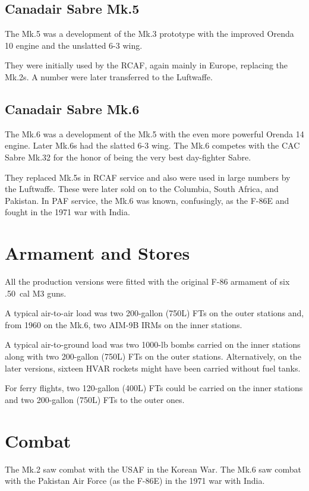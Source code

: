 \subsection{Canadair Sabre Mk.5}

The Mk.5 was a development of the Mk.3 prototype with the improved Orenda 10 engine and the unslatted 6-3 wing.

They were initially used by the RCAF, again mainly in Europe, replacing the Mk.2s. A number were later transferred to the Luftwaffe.

\subsection{Canadair Sabre Mk.6}

The Mk.6 was a development of the Mk.5 with the even more powerful Orenda 14 engine. Later Mk.6s had the slatted 6-3 wing. The Mk.6 competes with the CAC Sabre Mk.32 for the honor of being the very best day-fighter Sabre.

They replaced Mk.5s in RCAF service and also were used in large numbers by the Luftwaffe. These were later sold on to the Columbia, South Africa, and Pakistan. In PAF service, the Mk.6 was known, confusingly, as the F-86E and fought in the 1971 war with India.

\section{Armament and Stores}

All the production versions were fitted with the original F-86 armament of six .50~cal M3 guns.

A typical air-to-air load was two 200-gallon (750L) FTs on the outer stations and, from 1960 on the Mk.6, two AIM-9B IRMs on the inner stations.

A typical air-to-ground load was two 1000-lb bombs carried on the inner stations along with two 200-gallon (750L) FTs on the outer stations. Alternatively, on the later versions, sixteen HVAR rockets might have been carried without fuel tanks.

For ferry flights, two 120-gallon (400L) FTs could be carried on the inner stations and two 200-gallon (750L) FTs to the outer ones.

\section{Combat}

The Mk.2 saw combat with the USAF in the Korean War. The Mk.6 saw combat with the Pakistan Air Force (as the F-86E) in the 1971 war with India.

